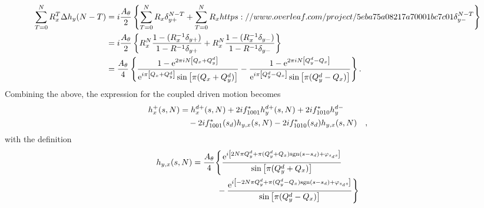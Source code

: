 %
\begin{align}
    \sum\limits_{T=0}^N R_x^T \Delta h_y(N-T)
        &=
        i\frac{A_\theta}{2} \left\{
            \sum\limits_{T=0}^N R_x \delta_{y+}^{N-T}
            +\sum\limits_{T=0}^N R_xhttps://www.overleaf.com/project/5eba75a08217a70001bc7c01 \delta_{y-}^{N-T}
        \right\}
        \notag \\
        &=
        i\frac{A_\theta}{2} \left\{
            R_x^N\frac{1-(R_x^{-1}\delta_{y+})}{1-R^{-1}\delta_{y+}}
            +R_x^N\frac{1-(R_x^{-1}\delta_{y-})}{1-R^{-1}\delta_{y-}}
        \right\}
        \notag \\
        &=
        \frac{A_\theta}{4} \left\{
            \frac{1-\text{e}^{2\pi i N\left[ Q_x + Q_y^d \right]}}{\text{e}^{i\pi \left[Q_x+Q_y^d\right]}\sin\left[\pi (Q_x+Q_y^d)\right]}
            -\frac{1-\text{e}^{2\pi i N\left[ Q_y^d - Q_x \right]}}{\text{e}^{i\pi \left[Q_y^d-Q_x\right] }\sin\left[\pi (Q_y^d-Q_x)\right]}
        \right\}
        .
\end{align}
%
Combining the above, the expression for the coupled driven motion becomes
%
\begin{align}
    h_x^+(s,N)&=
    h_x^{d+}(s,N) + 2if^{*}_{1001}  h_y^{d+}(s,N) + 2if^{*}_{1010} h_y^{d-} \notag \\
    &\quad
    -2if^*_{1001}(s_d) h_{y,x}(s,N)
    -2if^*_{1010}(s_d) h_{y,x}(s,N)
    \quad ,
\end{align}
with the definition
%
\begin{align}
    h_{y,x}(s,N) &= 
        \frac{A_\theta}{4} \Bigg\{
             \frac{\text{e}^{i \left[2N \pi Q_y^d + \pi( Q_y^d + Q_x )\text{sgn}(s-s_d) + \varphi_{s_ds}\right]}}
                {\sin\left[\pi (Q_y^d+Q_x)\right]}
                \notag \\  & \quad\quad\quad
            -\frac{\text{e}^{i \left[-2N\pi Q_y^d + \pi( Q_y^d - Q_x )\text{sgn}(s-s_d)+ \varphi_{s_ds}\right]}}
                {\sin\left[\pi (Q_y^d-Q_x)\right]}
        \Bigg\}
\end{align}
%
